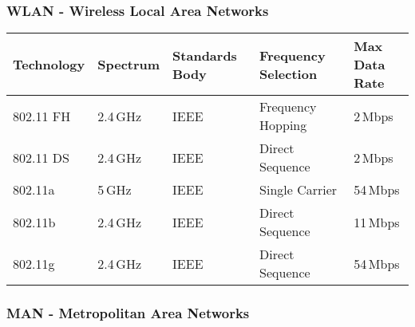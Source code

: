 \subsubsection{WLAN - Wireless Local Area Networks }
\begin{tabular}{|l|l|p{3cm}|p{3.5cm}|l|} \hline
Technology & Spectrum & Standards Body & Frequency Selection & Max Data Rate
\\ \hline \hline
802.11 FH  & 2.4\,GHz  & IEEE           & Frequency Hopping   & 2\,Mbps  \\ \hline
802.11 DS  & 2.4\,GHz  & IEEE           & Direct Sequence     & 2\,Mbps  \\ \hline
802.11a    &   5\,GHz  & IEEE           & Single Carrier      & 54\,Mbps \\ \hline
802.11b    & 2.4\,GHz  & IEEE           & Direct Sequence     & 11\,Mbps \\ \hline
802.11g    & 2.4\,GHz  & IEEE           & Direct Sequence     & 54\,Mbps \\ \hline
\end{tabular}

\subsubsection{MAN - Metropolitan Area Networks }
